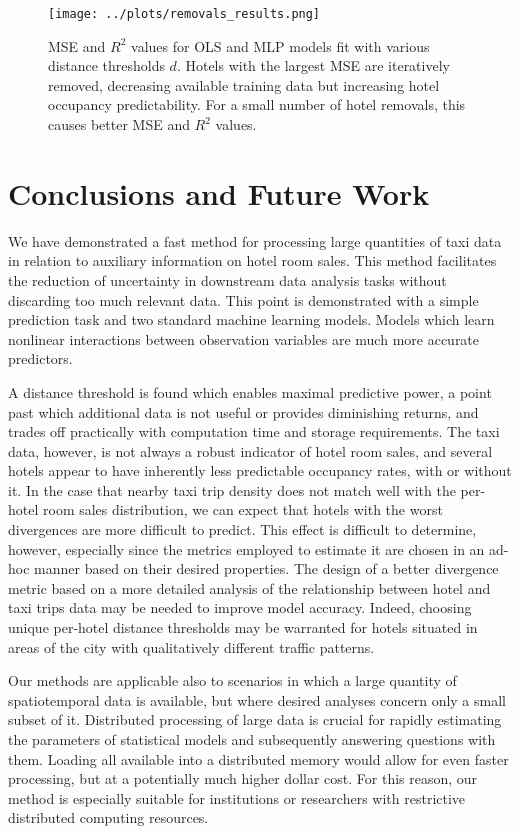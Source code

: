 \documentclass[useAMS, usenatbib]{biom}
\begin{document}
\begin{figure}
	\centering
    \captionsetup{justification=centering}
	\texttt{[image: ../plots/removals\_results.png]}
	\caption{MSE and $R^2$ values for OLS and MLP models fit with various distance thresholds $d$. Hotels with the largest MSE are iteratively removed, decreasing available training data but increasing hotel occupancy predictability. For a small number of hotel removals, this causes better MSE and $R^2$ values.}
	\label{fig:removals}
\end{figure}

\section{Conclusions and Future Work}
\label{s:conclusion}

We have demonstrated a fast method for processing large quantities of taxi data in relation to auxiliary information on hotel room sales. This method facilitates the reduction of uncertainty in downstream data analysis tasks without discarding too much relevant data. This point is demonstrated with a simple prediction task and two standard machine learning models. Models which learn nonlinear interactions between observation variables are much more accurate predictors.

A distance threshold is found which enables maximal predictive power, a point past which additional data is not useful or provides diminishing returns, and trades off practically with computation time and storage requirements. The taxi data, however, is not always a robust indicator of hotel room sales, and several hotels appear to have inherently less predictable occupancy rates, with or without it. In the case that nearby taxi trip density does not match well with the per-hotel room sales distribution, we can expect that hotels with the worst divergences are more difficult to predict. This effect is difficult to determine, however, especially since the metrics employed to estimate it are chosen in an ad-hoc manner based on their desired properties. The design of a better divergence metric based on a more detailed analysis of the relationship between hotel and taxi trips data may be needed to improve model accuracy. Indeed, choosing unique per-hotel distance thresholds may be warranted for hotels situated in areas of the city with qualitatively different traffic patterns.

Our methods are applicable also to scenarios in which a large quantity of spatiotemporal data is available, but where desired analyses concern only a small subset of it. Distributed processing of large data is crucial for rapidly estimating the parameters of statistical models and subsequently answering questions with them. Loading all available into a distributed memory would allow for even faster processing, but at a potentially much higher dollar cost. For this reason, our method is especially suitable for institutions or researchers with restrictive distributed computing resources.
\end{document}
